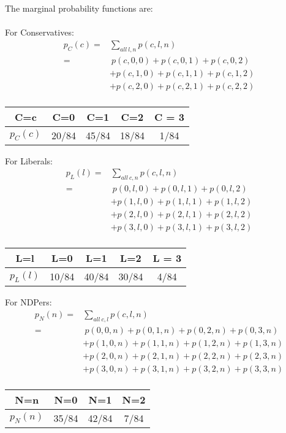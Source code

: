 \documentclass{article}
\begin{document}
The marginal probability functions are:\\
\\
For Conservatives:
\begin{equation} \label{eq1}
\begin{split}
p_C(c) = & \sum_{all\ l, n} p(c, l, n) \\
 = &\ p(c, 0, 0) + p(c,  0, 1) + p(c, 0, 2) \\
& + p(c, 1, 0) + p(c, 1, 1) + p(c, 1, 2) \\
& + p(c,  2, 0) + p(c, 2, 1) + p(c, 2, 2) \\
\end{split}
\end{equation}
\begin{center}
 \begin{tabular}{|| c c c c c ||} 
 \hline
C=c & C=0 & C=1 & C=2 & C = 3\\ [0.5ex] 
 \hline\hline
$p_C(c)$ & 20/84 & 45/84 & 18/84 & 1/84 \\ 
 \hline
\end{tabular}
\end{center}
For Liberals:
\begin{equation} \label{eq2}
\begin{split}
p_L(l) = & \sum_{all\ c, n} p(c, l, n) \\
 = &\ p(0, l, 0) + p(0,  l, 1) + p(0, l, 2) \\
& + p(1, l, 0) + p(1, l, 1) + p(1, l, 2) \\
& + p(2, l, 0) + p(2, l, 1) + p(2, l, 2) \\
& + p(3, l, 0) + p(3, l, 1) + p(3, l, 2) \\
\end{split}
\end{equation}
\begin{center}
 \begin{tabular}{|| c c c c c ||} 
 \hline
L=l & L=0 & L=1 & L=2 & L = 3\\ [0.5ex] 
 \hline\hline
$p_L(l)$ & 10/84 & 40/84 & 30/84 & 4/84 \\ 
 \hline
\end{tabular}
\end{center}
For NDPers:
\begin{equation} \label{eq3}
\begin{split}
p_N(n) = & \sum_{all\ c, l} p(c, l, n) \\
 = &\ p(0, 0, n) + p(0, 1, n) + p(0, 2, n) + p(0, 3, n) \\
& + p(1, 0, n) + p(1, 1, n) + p(1, 2, n) + p(1, 3, n) \\
& + p(2, 0, n) + p(2, 1, n) + p(2, 2, n) + p(2, 3, n) \\
& + p(3, 0, n) + p(3, 1, n) + p(3, 2, n) + p(3, 3, n) \\
\end{split}
\end{equation}
\begin{center}
 \begin{tabular}{|| c c c c ||} 
 \hline
N=n & N=0 & N=1 & N=2\\ [0.5ex] 
 \hline\hline
$p_N(n)$ & 35/84 & 42/84 & 7/84\\ 
 \hline
\end{tabular}
\end{center}
\end{document}
